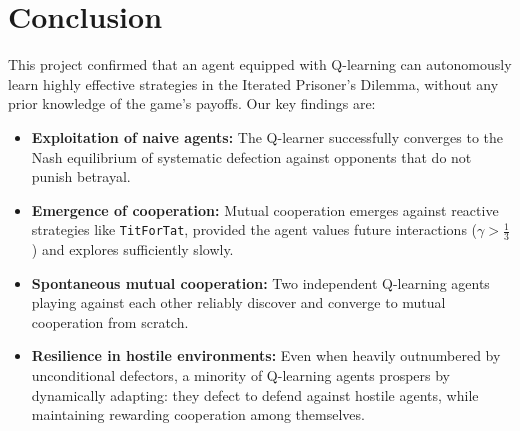 \documentclass[11pt, a4paper]{article}
\begin{document}
\section{Conclusion}
\label{sec:conclusion}

This project confirmed that an agent equipped with Q-learning can autonomously learn highly effective strategies in the Iterated Prisoner's Dilemma, without any prior knowledge of the game's payoffs. Our key findings are:

\begin{itemize}
    \item \textbf{Exploitation of naive agents:} The Q-learner successfully converges to the Nash equilibrium of systematic defection against opponents that do not punish betrayal.
    \item \textbf{Emergence of cooperation:} Mutual cooperation emerges against reactive strategies like \texttt{TitForTat}, provided the agent values future interactions ($\gamma > \frac{1}{3}$) and explores sufficiently slowly.
    \item \textbf{Spontaneous mutual cooperation:} Two independent Q-learning agents playing against each other reliably discover and converge to mutual cooperation from scratch.
    \item \textbf{Resilience in hostile environments:} Even when heavily outnumbered by unconditional defectors, a minority of Q-learning agents prospers by dynamically adapting: they defect to defend against hostile agents, while maintaining rewarding cooperation among themselves.
\end{itemize}

\newpage

\end{document}
